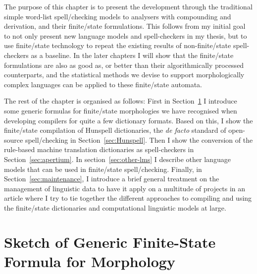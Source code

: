\documentclass[officiallayout,final]{unihelcompling}
\begin{document}
The purpose of this chapter is to present the development through the
traditional simple word-list spell\-/checking models to 
analysers with compounding and derivation, and their finite\-/state formulations.
This follows from my initial goal to not only present new language models and
spell-checkers in my thesis, but to use finite\-/state technology to repeat the
existing results of non-finite\-/state spell-checkers as a baseline. In the later
chapters I will show that the finite\-/state formulations are also as good as, or
better than their algorithmically processed counterparts, and the statistical
methods we devise to support morphologically complex languages can be applied
to these finite\-/state automata.

The rest of the chapter is organised as follows: First in
Section~\ref{sec:generic} I introduce some generic formulas for finite\-/state
morphologies we have recognised when developing compilers for quite a few
dictionary formats. Based on this, I show the finite\-/state compilation of
Hunspell dictionaries, the \emph{de facto} standard of open-source spell\-/checking in
Section~\ref{sec:Hunspell}.  Then I show the conversion of the rule-based
machine translation dictionaries as spell-checkers in
Section~\ref{sec:apertium}. In section~\ref{sec:other-lms} I describe other
language models that can be used in finite\-/state spell\-/checking. Finally, in
Section~\ref{sec:maintenance}, I introduce a brief general treatment on the
management of linguistic data to have it apply on a multitude of projects in an
article where I try to tie together the different approaches to compiling and
using the finite\-/state dictionaries and computational linguistic models at
large.

\section{Sketch of Generic Finite-State Formula for Morphology}
\label{sec:generic}
\end{document}
